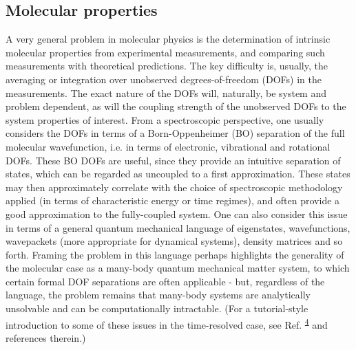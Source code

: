 \documentclass[10pt]{article}
\begin{document}
\subsection{Molecular properties}
A very general problem in molecular physics is the determination of intrinsic molecular properties from experimental measurements, and comparing such measurements with theoretical predictions. The key difficulty is, usually, the averaging or integration over unobserved degrees-of-freedom (DOFs) in the measurements. The exact nature of the DOFs will, naturally, be system and problem dependent, as will the coupling strength of the unobserved DOFs to the system properties of interest. From a spectroscopic perspective, one usually considers the DOFs in terms of a Born-Oppenheimer (BO) separation of the full molecular wavefunction, i.e. in terms of electronic, vibrational and rotational DOFs. These BO DOFs are useful, since they provide an intuitive separation of states, which can be regarded as uncoupled to a first approximation. These states may then approximately correlate with the choice of spectroscopic methodology applied (in terms of characteristic energy or time regimes), and often provide a good approximation to the fully-coupled system. One can also consider this issue in terms of a general quantum mechanical language of eigenstates, wavefunctions, wavepackets (more appropriate for dynamical systems), density matrices and so forth. Framing the problem in this language perhaps highlights the generality of the molecular case as a many-body quantum mechanical matter system, to which certain formal DOF separations are often applicable - but, regardless of the language, the problem remains that many-body systems are analytically unsolvable and can be computationally intractable. 
(For a tutorial-style introduction to some of these issues in the time-resolved case, see Ref. \textsuperscript{\hyperref[csl:4]{4}} and references therein.) %
\end{document}
